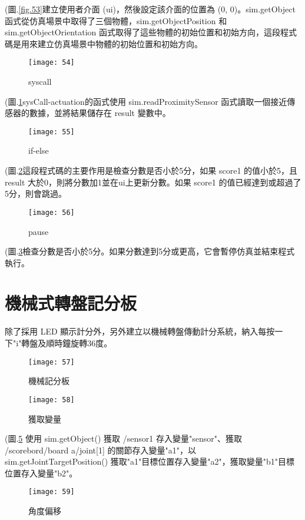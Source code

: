 \newpage
(圖.\ref{fig.53}建立使用者介面 (ui)，然後設定該介面的位置為 (0, 0)。sim.getObject 函式從仿真場景中取得了三個物體，sim.getObjectPosition 和 sim.getObjectOrientation 函式取得了這些物體的初始位置和初始方向，這段程式碼是用來建立仿真場景中物體的初始位置和初始方向。\\
\begin{figure}[hbt!]
\begin{center}
\texttt{[image: 54]}
\caption{\Large syscall}\label{fig.54}
\end{center}
\end{figure}

(圖.\ref{fig.54}sysCall-actuation的函式使用 sim.readProximitySensor 函式讀取一個接近傳感器的數據，並將結果儲存在 result 變數中。\\
\newpage
\begin{figure}[hbt!]
\begin{center}
\texttt{[image: 55]}
\caption{\Large if-else}\label{fig.55}
\end{center}
\end{figure}

(圖.\ref{fig.55}這段程式碼的主要作用是檢查分數是否小於5分，如果 score1 的值小於5，且 result 大於0，則將分數加1並在ui上更新分數。如果 score1 的值已經達到或超過了5分，則會跳過。\\
\begin{figure}[hbt!]
\begin{center}
\texttt{[image: 56]}
\caption{\Large pause}\label{fig.56}
\end{center}
\end{figure}

(圖.\ref{fig.56}檢查分數是否小於5分。如果分數達到5分或更高，它會暫停仿真並結束程式執行。\\
\newpage
\section{機械式轉盤記分板}
  除了採用 LED 顯示計分外，另外建立以機械轉盤傳動計分系統，納入每按一下"i"轉盤及順時鐘旋轉36度。\\
\begin{figure}[hbt!]
\begin{center}
\texttt{[image: 57]}
\caption{\Large 機械記分板}\label{fig.57}
\end{center}
\end{figure}
\newpage
\begin{figure}[hbt!]
\begin{center}
\texttt{[image: 58]}
\caption{\Large 獲取變量}\label{fig.58}
\end{center}
\end{figure}
(圖.\ref{fig.58} 使用 sim.getObject() 獲取 /sensor1 存入變量"sensor"、獲取 /scorebord/board a/joint[1] 的關節存入變量"a1"，以 sim.getJointTargetPosition() 獲取"a1"目標位置存入變量"a2"，獲取變量"b1"目標位置存入變量"b2"。\\
\begin{figure}[hbt!]
\begin{center}
\texttt{[image: 59]}
\caption{\Large 角度偏移}\label{fig.59}
\end{center}
\end{figure}


